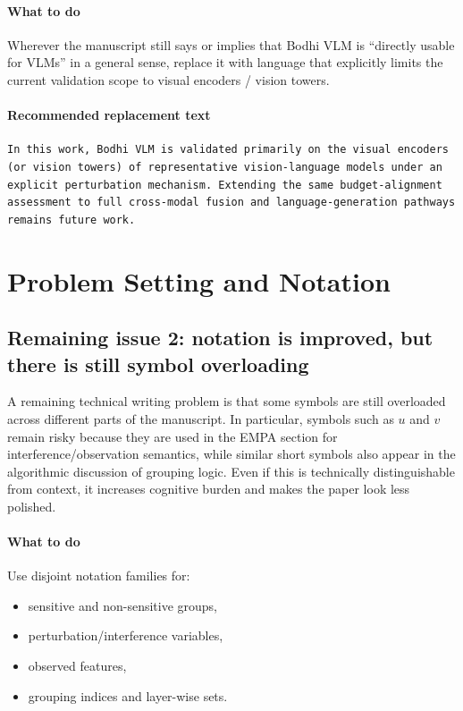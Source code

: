 \documentclass[11pt]{article}
\begin{document}
\paragraph{What to do}
Wherever the manuscript still says or implies that Bodhi VLM is ``directly usable for VLMs'' in a general sense, replace it with language that explicitly limits the current validation scope to visual encoders / vision towers.

\paragraph{Recommended replacement text}
\begin{verbatim}
In this work, Bodhi VLM is validated primarily on the visual encoders
(or vision towers) of representative vision-language models under an
explicit perturbation mechanism. Extending the same budget-alignment
assessment to full cross-modal fusion and language-generation pathways
remains future work.
\end{verbatim}

\section{Problem Setting and Notation}

\subsection*{Remaining issue 2: notation is improved, but there is still symbol overloading}
A remaining technical writing problem is that some symbols are still overloaded across different parts of the manuscript. In particular, symbols such as \(u\) and \(v\) remain risky because they are used in the EMPA section for interference/observation semantics, while similar short symbols also appear in the algorithmic discussion of grouping logic. Even if this is technically distinguishable from context, it increases cognitive burden and makes the paper look less polished.

\paragraph{What to do}
Use disjoint notation families for:
\begin{itemize}
    \item sensitive and non-sensitive groups,
    \item perturbation/interference variables,
    \item observed features,
    \item grouping indices and layer-wise sets.
\end{itemize}
\end{document}
